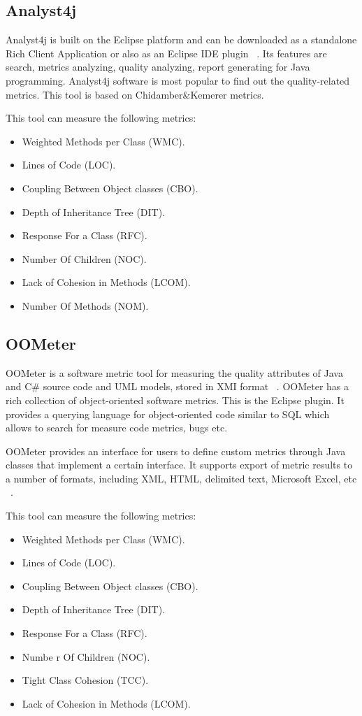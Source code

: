 \subsection{Analyst4j}
Analyst4j is built on the Eclipse platform and can be downloaded as a standalone Rich Client Application or also as an Eclipse
IDE plugin ~\cite{analyst4j}. Its features are search, metrics analyzing, quality analyzing, report generating for Java programming.
Analyst4j software is most popular to find out the quality-related metrics. This tool is based on Chidamber\&Kemerer metrics.

This tool can measure the following metrics:
\begin{itemize}
	\item Weighted Methods per Class (WMC).
	\item Lines of Code (LOC). 
	\item Coupling Between Object classes (CBO).
	\item Depth of Inheritance Tree (DIT).
	\item Response For a Class (RFC).
	\item Number Of Children (NOC).
	\item Lack of Cohesion in Methods (LCOM).
	\item Number Of Methods (NOM).
\end{itemize}

\subsection{OOMeter}

OOMeter is a software metric tool for measuring the quality attributes of Java and C\# source code and UML models, stored in XMI format ~\cite{meter}. OOMeter has a rich collection of object-oriented software metrics. This is the Eclipse plugin. It provides a querying language for object-oriented code similar to SQL which allows to search for measure code metrics, bugs etc.

OOMeter provides an interface for users to define custom metrics through Java classes that implement a certain interface. It supports export of metric results to a number of formats, including XML, HTML, delimited text, Microsoft Excel, etc ~\cite{meter2}.

This tool can measure the following metrics:

\begin{itemize}
	\item Weighted Methods per Class (WMC).
	\item Lines of Code (LOC). 
	\item Coupling Between Object classes (CBO).
	\item Depth of Inheritance Tree (DIT).
	\item Response For a Class (RFC).
	\item Numbe r Of Children (NOC).
	\item Tight Class Cohesion (TCC).
	\item Lack of Cohesion in Methods (LCOM).
\end{itemize}



